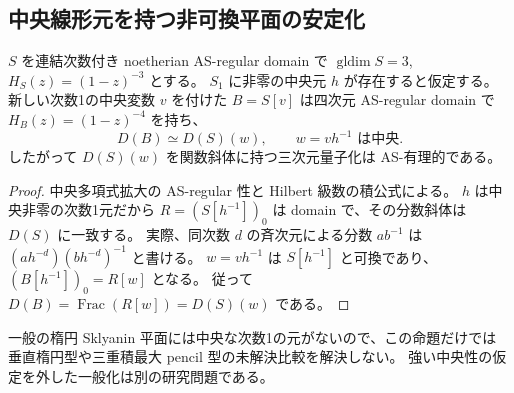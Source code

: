 \subsection{中央線形元を持つ非可換平面の安定化}
\begin{proposition}\label{prop:central-stabilization}
$S$ を連結次数付き noetherian AS-regular domain で
$\operatorname{gldim}S=3$, $H_S(z)=(1-z)^{-3}$ とする。
$S_1$ に非零の中央元 $h$ が存在すると仮定する。
新しい次数1の中央変数 $v$ を付けた $B=S[v]$ は四次元 AS-regular domain で
$H_B(z)=(1-z)^{-4}$ を持ち、
\[
 D(B)\simeq D(S)(w),\qquad w=vh^{-1}\text{ は中央}.
\]
したがって $D(S)(w)$ を関数斜体に持つ三次元量子化は AS-有理的である。
\end{proposition}
\begin{proof}
中央多項式拡大の AS-regular 性と Hilbert 級数の積公式による。
$h$ は中央非零の次数1元だから
$R=(S[h^{-1}])_0$ は domain で、その分数斜体は $D(S)$ に一致する。
実際、同次数 $d$ の斉次元による分数 $ab^{-1}$ は
$(ah^{-d})(bh^{-d})^{-1}$ と書ける。
$w=vh^{-1}$ は $S[h^{-1}]$ と可換であり、
$(B[h^{-1}])_0=R[w]$ となる。
従って $D(B)=\operatorname{Frac}(R[w])=D(S)(w)$ である。
\end{proof}
\begin{remark}
一般の楕円 Sklyanin 平面には中央な次数1の元がないので、この命題だけでは
垂直楕円型や三重積最大 pencil 型の未解決比較を解決しない。
強い中央性の仮定を外した一般化は別の研究問題である。
\end{remark}
